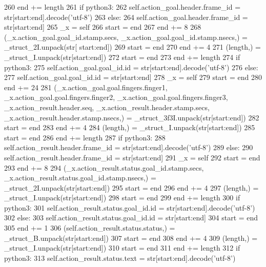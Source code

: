 \begin{DoxyCode}
260       end += length
261       \textcolor{keywordflow}{if} python3:
262         self.action\_goal.header.frame\_id = str[start:end].decode(\textcolor{stringliteral}{'utf-8'})
263       \textcolor{keywordflow}{else}:
264         self.action\_goal.header.frame\_id = str[start:end]
265       \_x = self
266       start = end
267       end += 8
268       (\_x.action\_goal.goal\_id.stamp.secs, \_x.action\_goal.goal\_id.stamp.nsecs,) = \_struct\_2I.unpack(str[
      start:end])
269       start = end
270       end += 4
271       (length,) = \_struct\_I.unpack(str[start:end])
272       start = end
273       end += length
274       \textcolor{keywordflow}{if} python3:
275         self.action\_goal.goal\_id.id = str[start:end].decode(\textcolor{stringliteral}{'utf-8'})
276       \textcolor{keywordflow}{else}:
277         self.action\_goal.goal\_id.id = str[start:end]
278       \_x = self
279       start = end
280       end += 24
281       (\_x.action\_goal.goal.fingers.finger1, \_x.action\_goal.goal.fingers.finger2, 
      \_x.action\_goal.goal.fingers.finger3, \_x.action\_result.header.seq, \_x.action\_result.header.stamp.secs, 
      \_x.action\_result.header.stamp.nsecs,) = \_struct\_3f3I.unpack(str[start:end])
282       start = end
283       end += 4
284       (length,) = \_struct\_I.unpack(str[start:end])
285       start = end
286       end += length
287       \textcolor{keywordflow}{if} python3:
288         self.action\_result.header.frame\_id = str[start:end].decode(\textcolor{stringliteral}{'utf-8'})
289       \textcolor{keywordflow}{else}:
290         self.action\_result.header.frame\_id = str[start:end]
291       \_x = self
292       start = end
293       end += 8
294       (\_x.action\_result.status.goal\_id.stamp.secs, \_x.action\_result.status.goal\_id.stamp.nsecs,) = 
      \_struct\_2I.unpack(str[start:end])
295       start = end
296       end += 4
297       (length,) = \_struct\_I.unpack(str[start:end])
298       start = end
299       end += length
300       \textcolor{keywordflow}{if} python3:
301         self.action\_result.status.goal\_id.id = str[start:end].decode(\textcolor{stringliteral}{'utf-8'})
302       \textcolor{keywordflow}{else}:
303         self.action\_result.status.goal\_id.id = str[start:end]
304       start = end
305       end += 1
306       (self.action\_result.status.status,) = \_struct\_B.unpack(str[start:end])
307       start = end
308       end += 4
309       (length,) = \_struct\_I.unpack(str[start:end])
310       start = end
311       end += length
312       \textcolor{keywordflow}{if} python3:
313         self.action\_result.status.text = str[start:end].decode(\textcolor{stringliteral}{'utf-8'})

\end{DoxyCode}
